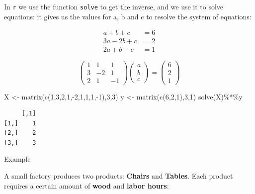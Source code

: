 \documentclass[
  letterpaper,
  DIV=11,
  numbers=noendperiod]{scrartcl}
\newenvironment{Shaded}{\begin{snugshade}}{\end{snugshade}}
\newcommand{\DecValTok}[1]{\textcolor[rgb]{0.68,0.00,0.00}{#1}}
\newcommand{\FunctionTok}[1]{\textcolor[rgb]{0.28,0.35,0.67}{#1}}
\newcommand{\NormalTok}[1]{\textcolor[rgb]{0.00,0.23,0.31}{#1}}
\newcommand{\OtherTok}[1]{\textcolor[rgb]{0.00,0.23,0.31}{#1}}
\newcommand{\SpecialCharTok}[1]{\textcolor[rgb]{0.37,0.37,0.37}{#1}}
\begin{document}
In \texttt{r} we use the function \texttt{solve} to get the inverse, and
we use it to solve equations: it gives us the values for a, b and c to
resolve the system of equations:

\begin{align*}
a + b + c &= 6 \\
3a - 2b + c &= 2 \\
2a + b - c &= 1
\end{align*}

\[
\begin{pmatrix}
1 & 1 & 1 \\
3 & -2 & 1 \\
2 & 1 & -1
\end{pmatrix}
\begin{pmatrix}
a \\
b \\
c 
\end{pmatrix}
=
\begin{pmatrix}
6 \\
2 \\
1 
\end{pmatrix}
\]

\begin{Shaded}
\begin{Highlighting}[]
\NormalTok{X }\OtherTok{\textless{}{-}} \FunctionTok{matrix}\NormalTok{(}\FunctionTok{c}\NormalTok{(}\DecValTok{1}\NormalTok{,}\DecValTok{3}\NormalTok{,}\DecValTok{2}\NormalTok{,}\DecValTok{1}\NormalTok{,}\SpecialCharTok{{-}}\DecValTok{2}\NormalTok{,}\DecValTok{1}\NormalTok{,}\DecValTok{1}\NormalTok{,}\DecValTok{1}\NormalTok{,}\SpecialCharTok{{-}}\DecValTok{1}\NormalTok{),}\DecValTok{3}\NormalTok{,}\DecValTok{3}\NormalTok{)}
\NormalTok{y }\OtherTok{\textless{}{-}} \FunctionTok{matrix}\NormalTok{(}\FunctionTok{c}\NormalTok{(}\DecValTok{6}\NormalTok{,}\DecValTok{2}\NormalTok{,}\DecValTok{1}\NormalTok{),}\DecValTok{3}\NormalTok{,}\DecValTok{1}\NormalTok{)}
\FunctionTok{solve}\NormalTok{(X)}\SpecialCharTok{\%*\%}\NormalTok{y}
\end{Highlighting}
\end{Shaded}

\begin{verbatim}
     [,1]
[1,]    1
[2,]    2
[3,]    3
\end{verbatim}

Example

A small factory produces two products: \textbf{Chairs} and
\textbf{Tables}. Each product requires a certain amount of \textbf{wood}
and \textbf{labor hours}:
\end{document}
